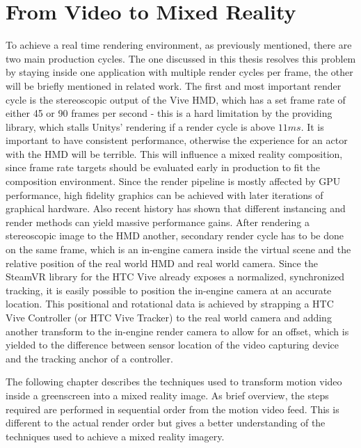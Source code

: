 %
\chapter{From Video to Mixed Reality}
\label{chap:video2mr}


To achieve a real time rendering environment, as previously mentioned, there 
are two main production cycles. The one discussed in this thesis resolves this 
problem by staying inside one application with multiple render cycles per 
frame, the other will be briefly mentioned in related work. 
\newline
The first and most important render cycle is the stereoscopic output of the 
Vive HMD, which has a set frame rate of either 45 or 90 frames per second - 
this is a hard limitation by the providing library, which stalls Unitys' 
rendering if a render cycle is above $11ms$. It is important to have consistent 
performance, otherwise the experience for an actor with the HMD will be 
terrible. This will influence a mixed reality composition, since frame rate 
targets should be evaluated early in production to fit the composition 
environment. Since the render pipeline is mostly affected by GPU performance, 
high fidelity graphics can be achieved with later iterations of graphical 
hardware. Also recent history has shown that different instancing and render 
methods can yield massive performance gains.
\newline
After rendering a stereoscopic image to the HMD another, secondary render cycle 
has to be done on the same frame, which is an in-engine camera inside the 
virtual scene and the relative position of the real world HMD and real world 
camera. Since the SteamVR library for the HTC Vive already exposes a 
normalized, synchronized tracking, it is easily possible to position the 
in-engine camera at an accurate location. This positional and rotational data 
is achieved by strapping a HTC Vive Controller (or HTC Vive Tracker) to the 
real world camera and adding another transform to the in-engine render camera 
to allow for an offset, which is yielded to the difference between sensor 
location of the video capturing device and the tracking anchor of a controller.

The following chapter describes the techniques used to transform motion video 
inside a greenscreen into a mixed reality image. As brief overview, the steps 
required are performed in sequential order from the motion video feed. This is 
different to the actual render order but gives a better understanding of the 
techniques used to achieve a mixed reality imagery.

